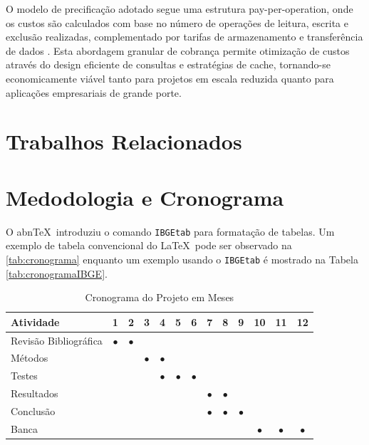 \documentclass[
	12pt,				    %
	openright,			    %
	oneside,			    %
	a4paper,			    %
    sumario=tradicional,    %
	english,			    %
	brazil,				    %
	]{abntex2}              %
\begin{document}
O modelo de precificação adotado segue uma estrutura pay-per-operation, onde os custos são calculados com base no número de operações de leitura, escrita e exclusão realizadas, complementado por tarifas de armazenamento e transferência de dados \cite{firebase2023pricing}. Esta abordagem granular de cobrança permite otimização de custos através do design eficiente de consultas e estratégias de cache, tornando-se economicamente viável tanto para projetos em escala reduzida quanto para aplicações empresariais de grande porte.

\chapter{Trabalhos Relacionados}\label{sec:TrabRel}

\chapter{Medodologia e Cronograma}\label{sec:metodos}

O abn\TeX\ introduziu o comando \texttt{IBGEtab} para formatação de tabelas. Um exemplo de tabela convencional do \LaTeX\ pode ser observado na \autoref{tab:cronograma} enquanto um exemplo usando o \texttt{IBGEtab} é mostrado na Tabela \ref{tab:cronogramaIBGE}.

\begin{table}[htbp]
  \centering
    \caption[Cronograma Normal]{Cronograma do Projeto em Meses}
    \label{tab:cronograma}
    \begin{tabular}{lcccccccccccc} %
    \toprule
    \textbf{Atividade} & \textbf{1} & \textbf{2} & \textbf{3} & \textbf{4} & \textbf{5} & \textbf{6} & \textbf{7} & \textbf{8} & \textbf{9} & \textbf{10} & \textbf{11} & \textbf{12} \\
    \midrule
        Revisão Bibliográfica & $\bullet$ & $\bullet$ & & & & & & & & & & \\
        Métodos & & & $\bullet$ & $\bullet$ & & & & & & & & \\
        Testes & & & & $\bullet$ & $\bullet$ & $\bullet$ & & & & & & \\
        Resultados & & & & & & & $\bullet$ & $\bullet$ & & & & \\
        Conclusão & & & & & & & $\bullet$ & $\bullet$ & $\bullet$ & & & \\
        Banca & & & & & & &&&& $\bullet$ & $\bullet$ & $\bullet$ \\
    \bottomrule
    \end{tabular}%
\end{table}%
\end{document}
